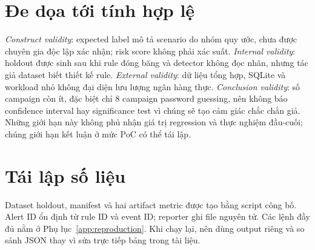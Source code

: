 \section{Đe dọa tới tính hợp lệ}

\emph{Construct validity}: expected label mô tả scenario do nhóm quy ước, chưa
được chuyên gia độc lập xác nhận; risk score không phải xác suất. \emph{Internal
validity}: holdout được sinh sau khi rule đóng băng và detector không đọc nhãn,
nhưng tác giả dataset biết thiết kế rule. \emph{External validity}: dữ liệu tổng
hợp, SQLite và workload nhỏ không đại diện lưu lượng ngân hàng thực.
\emph{Conclusion validity}: số campaign còn ít, đặc biệt chỉ 8 campaign password
guessing, nên không báo confidence interval hay significance test vì chúng sẽ
tạo cảm giác chắc chắn giả. Những giới hạn này không phủ nhận giá trị regression
và thực nghiệm đầu-cuối; chúng giới hạn kết luận ở mức PoC có thể tái lập.

\section{Tái lập số liệu}

Dataset holdout, manifest và hai artifact metric được tạo bằng script công bố.
Alert ID ổn định từ rule ID và event ID; reporter ghi file nguyên tử. Các lệnh
đầy đủ nằm ở Phụ lục~\ref{app:reproduction}. Khi chạy lại, nên dùng output riêng
và so sánh JSON thay vì sửa trực tiếp bảng trong tài liệu.
